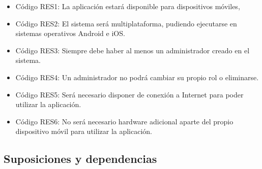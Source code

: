 \begin{itemize}
    \item Código RES1: La aplicación estará disponible para dispositivos móviles,
    \item Código RES2: El sistema será multiplataforma, pudiendo ejecutarse en sistemas operativos Android e iOS.
    \item Código RES3: Siempre debe haber al menos un administrador creado en el sistema.
    \item Código RES4: Un administrador no podrá cambiar su propio rol o eliminarse.
    \item Código RES5: Será necesario disponer de conexión a Internet para poder utilizar la aplicación.
    \item Código RES6: No será necesario hardware adicional aparte del propio dispositivo móvil para utilizar la aplicación. 
\end{itemize}

\subsection{Suposiciones y dependencias}

